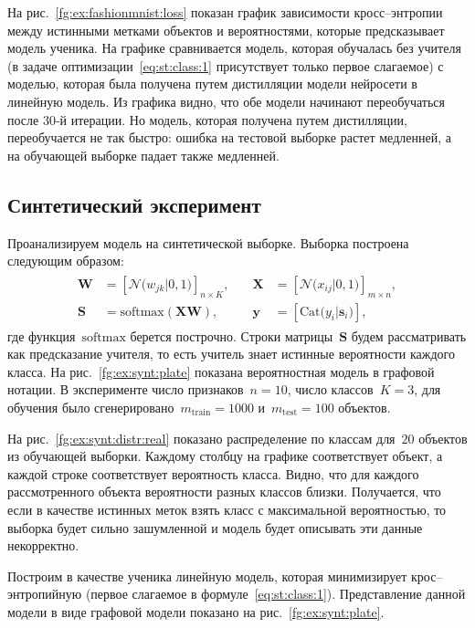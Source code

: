 \documentclass[12pt]{a&t}
\begin{document}
На рис.~\ref{fg:ex:fashionmnist:loss} показан график зависимости кросс--энтропии между истинными метками объектов и вероятностями, которые предсказывает модель ученика. На графике сравнивается модель, которая обучалась без учителя (в задаче оптимизации~\eqref{eq:st:class:1} присутствует только первое слагаемое) с моделью, которая была получена путем дистилляции модели нейросети в линейную модель. Из графика видно, что обе модели начинают переобучаться после 30-й итерации. Но модель, которая получена путем дистилляции, переобучается не так быстро: ошибка на тестовой выборке растет медленней, а на обучающей выборке падает также медленней.


\subsection{Синтетический эксперимент}
Проанализируем модель на синтетической выборке. Выборка построена следующим образом:
\begin{gather}
\begin{aligned}
\mathbf{W} &= \left[\mathcal{N}\bigr(w_{jk}|0, 1\bigr)\right]_{n\times K}, \quad &\mathbf{X} &= \left[\mathcal{N}\bigr(x_{ij}|0, 1\bigr)\right]_{m\times n}, \\
 \mathbf{S} &= \text{softmax}\left(\mathbf{XW}\right), \quad &\mathbf{y} &= \left[\text{Cat}\bigr(y_i| \mathbf{s}_i\bigr)\right],
\end{aligned}
\end{gather}
где функция~$\text{softmax}$ берется построчно. Строки матрицы~$\mathbf{S}$ будем рассматривать как предсказание учителя, то есть учитель знает истинные вероятности каждого класса. На рис.~\ref{fg:ex:synt:plate} показана вероятностная модель в графовой нотации. В эксперименте число признаков~$n=10$, число классов~$K=3$, для обучения было сгенерировано~$m_{\text{train}}=1000$ и~$m_{\text{test}}=100$ объектов.

На рис.~\ref{fg:ex:synt:distr:real} показано распределение по классам для~$20$ объектов из обучающей выборки. Каждому столбцу на графике соответствует объект, а каждой строке соответствует вероятность класса. Видно, что для каждого рассмотренного объекта вероятности разных классов близки. Получается, что если в качестве истинных меток взять класс с максимальной вероятностью, то выборка будет сильно зашумленной и модель будет описывать эти данные некорректно.

Построим в качестве ученика линейную модель, которая минимизирует крос--энтропийную (первое слагаемое в формуле~\eqref{eq:st:class:1}). Представление данной модели в виде графовой модели показано на рис.~\ref{fg:ex:synt:plate}.
\end{document}
